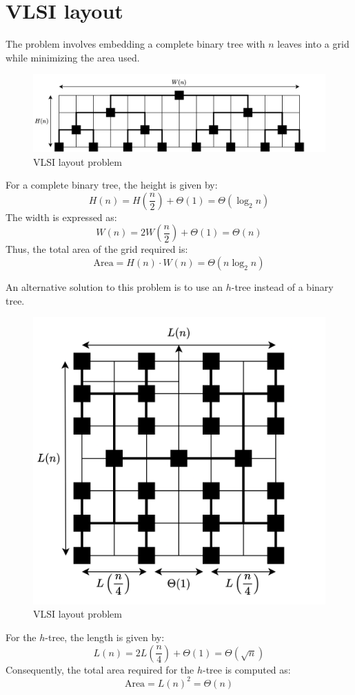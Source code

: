 \section{VLSI layout}

The problem involves embedding a complete binary tree with $n$ leaves into a grid while minimizing the area used.
\begin{figure}[H]
    \centering
    \includegraphics[width=0.9\linewidth]{images/vlsi.png}
    \caption{VLSI layout problem}
\end{figure}
For a complete binary tree, the height is given by:
\[H(n)=H\left(\dfrac{n}{2}\right)+\Theta(1)=\Theta(\log_2n)\]
The width is expressed as:
\[W(n)=2W\left(\dfrac{n}{2}\right)+\Theta(1)=\Theta(n)\]
Thus, the total area of the grid required is:
\[\text{Area}=H(n)\cdot W(n)=\Theta(n\log_2n)\]

An alternative solution to this problem is to use an $h$-tree instead of a binary tree.
\begin{figure}[H]
    \centering
    \includegraphics[width=0.65\linewidth]{images/vlsi1.png}
    \caption{VLSI layout problem}
\end{figure}
For the $h$-tree, the length is given by:
\[L(n)=2L\left(\dfrac{n}{4}\right)+\Theta(1)=\Theta(\sqrt{n})\]
Consequently, the total area required for the $h$-tree is computed as:
\[\text{Area}=L(n)^2=\Theta(n)\]